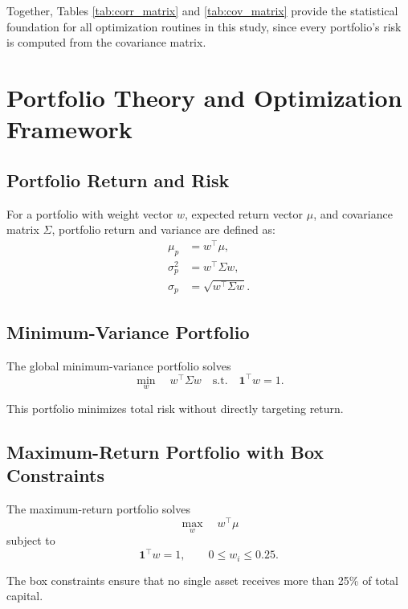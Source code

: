 \documentclass[wcp]{jmlr}
\begin{document}
\begin{abstract - TEST}
Together, Tables \ref{tab:corr_matrix} and \ref{tab:cov_matrix} provide the statistical foundation for all optimization routines in this study, since every portfolio’s risk is computed from the covariance matrix.

\section{Portfolio Theory and Optimization Framework}

\subsection{Portfolio Return and Risk}

For a portfolio with weight vector $w$, expected return vector $\mu$, and covariance matrix $\Sigma$, portfolio return and variance are defined as:
\begin{align}
\mu_p &= w^\top \mu, \\
\sigma_p^2 &= w^\top \Sigma w, \\
\sigma_p &= \sqrt{w^\top \Sigma w}.
\end{align}

\subsection{Minimum-Variance Portfolio}

The global minimum-variance portfolio solves
\begin{equation}
\min_w \quad w^\top \Sigma w \quad \text{s.t.} \quad \mathbf{1}^\top w = 1.
\end{equation}

This portfolio minimizes total risk without directly targeting return.

\subsection{Maximum-Return Portfolio with Box Constraints}

The maximum-return portfolio solves
\begin{equation}
\max_w \quad w^\top \mu
\end{equation}
subject to
\begin{equation}
\mathbf{1}^\top w = 1, \qquad 0 \leq w_i \leq 0.25.
\end{equation}

The box constraints ensure that no single asset receives more than 25\% of total capital.


\end{abstract - TEST}
\end{document}
